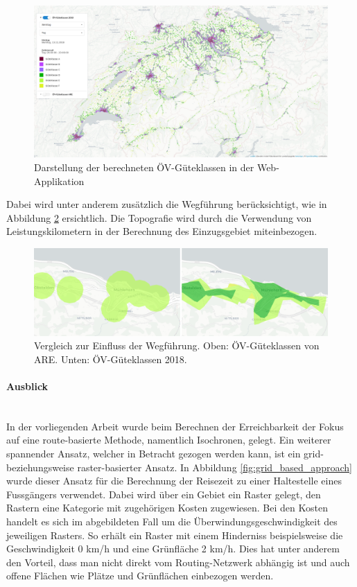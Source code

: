 \begin{figure}[ht]
    \centering
    \includegraphics[width=1\linewidth]{technicalreport/img/resultat_oevgk18_uebersicht}
    \caption[Darstellung der berechneten ÖV-Güteklassen in der Web-Applikation]{Darstellung der berechneten ÖV-Güteklassen in der Web-Applikation}
    \label{fig:mntg_sum_resultat_webapp_uebersicht}
\end{figure}

Dabei wird unter anderem zusätzlich die Wegführung berücksichtigt, wie in Abbildung \ref{fig:vergleich_wegfuehrung} ersichtlich.
Die Topografie wird durch die Verwendung von Leistungskilometern in der Berechnung des Einzugsgebiet miteinbezogen.

\begin{figure}[ht]
    \centering
    \includegraphics[width=0.8\linewidth]{start/img/vergleich_wegfuehrung}
    \caption[Vergleich zur Einfluss der Wegführung]{Vergleich zur Einfluss der Wegführung. Oben: ÖV-Güteklassen von \ac{ARE}. Unten: ÖV-Güteklassen 2018.}
    \label{fig:vergleich_wegfuehrung}
\end{figure}

\paragraph{Ausblick}~\\
In der vorliegenden Arbeit wurde beim Berechnen der Erreichbarkeit der Fokus auf eine route-basierte Methode, namentlich Isochronen, gelegt.
Ein weiterer spannender Ansatz, welcher in Betracht gezogen werden kann, ist ein grid- beziehungsweise raster-basierter Ansatz.
In Abbildung \ref{fig:grid_based_approach} wurde dieser Ansatz für die Berechnung der Reisezeit zu einer Haltestelle eines Fussgängers verwendet.
Dabei wird über ein Gebiet ein Raster gelegt, den Rastern eine Kategorie mit zugehörigen Kosten zugewiesen.
Bei den Kosten handelt es sich im abgebildeten Fall um die Überwindungsgeschwindigkeit des jeweiligen Rasters.
So erhält ein Raster mit einem Hinderniss beispielsweise die Geschwindigkeit 0 km/h und eine Grünfläche 2 km/h.
Dies hat unter anderem den Vorteil, dass man nicht direkt vom Routing-Netzwerk abhängig ist und auch offene Flächen wie Plätze und Grünflächen einbezogen werden.

